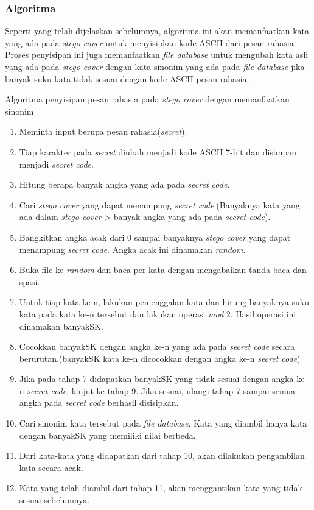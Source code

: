 \subsubsection{Algoritma}
Seperti yang telah dijelaskan sebelumnya, algoritma ini akan memanfaatkan kata yang ada pada \textit{stego cover} untuk menyisipkan kode ASCII dari pesan rahasia. Proses penyisipan ini juga memanfaatkan \textit{file database} untuk mengubah kata asli yang ada pada \textit{stego cover} dengan kata sinonim yang ada pada \textit{file database} jika banyak suku kata tidak sesuai dengan kode ASCII pesan rahasia.

Algoritma penyisipan pesan rahasia pada \textit{stego cover} dengan memanfaatkan sinonim

\begin{enumerate}
	\item Meminta input berupa pesan rahasia(\textit{secret}).
	\item Tiap karakter pada \textit{secret} diubah menjadi kode ASCII 7-bit dan disimpan menjadi \textit{secret code}.
	\item Hitung berapa banyak angka yang ada pada \textit{secret code}.
	\item Cari \textit{stego cover} yang dapat menampung \textit{secret code}.(Banyaknya kata yang ada dalam \textit{stego cover} > banyak angka yang ada pada \textit{secret code}).
	\item Bangkitkan angka acak dari 0 sampai banyaknya \textit{stego cover} yang dapat menampung \textit{secret code}. Angka acak ini dinamakan \textit{random}.
	\item Buka file ke-\textit{random} dan baca per kata dengan mengabaikan tanda baca dan spasi.
	\item Untuk tiap kata ke-n, lakukan pemenggalan kata dan hitung banyaknya suku kata pada kata ke-n tersebut dan lakukan operasi \textit{mod} 2. Hasil operasi ini dinamakan banyakSK.
	\item Cocokkan banyakSK dengan angka ke-n yang ada pada \textit{secret code} secara berurutan.(banyakSK kata ke-n dicocokkan dengan angka ke-n \textit{secret code})
	\item Jika pada tahap 7 didapatkan banyakSK yang tidak sesuai dengan angka ke-n \textit{secret code}, lanjut ke tahap 9. Jika sesuai, ulangi tahap 7 sampai semua angka pada \textit{secret code} berhasil disisipkan.
	\item Cari sinonim kata tersebut pada \textit{file database}. Kata yang diambil hanya kata dengan banyakSK yang memiliki nilai berbeda.
	\item Dari kata-kata yang didapatkan dari tahap 10, akan dilakukan pengambilan kata secara acak.
	\item Kata yang telah diambil dari tahap 11, akan menggantikan kata yang tidak sesuai sebelumnya.
\end{enumerate}

